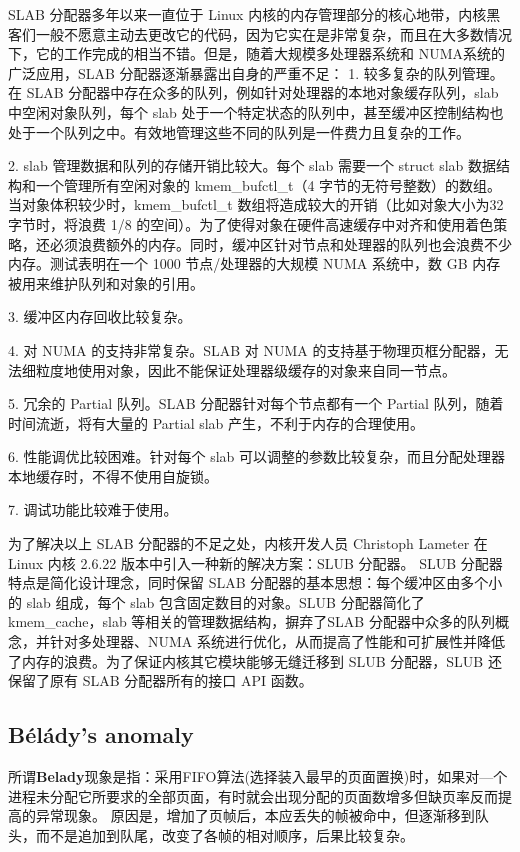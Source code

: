SLAB 分配器多年以来一直位于 Linux 内核的内存管理部分的核心地带，内核黑客们一般不愿意主动去更改它的代码，因为它实在是非常复杂，而且在大多数情况下，它的工作完成的相当不错。但是，随着大规模多处理器系统和 NUMA系统的广泛应用，SLAB 分配器逐渐暴露出自身的严重不足：
1. 较多复杂的队列管理。在 SLAB 分配器中存在众多的队列，例如针对处理器的本地对象缓存队列，slab 中空闲对象队列，每个 slab 处于一个特定状态的队列中，甚至缓冲区控制结构也处于一个队列之中。有效地管理这些不同的队列是一件费力且复杂的工作。

2. slab 管理数据和队列的存储开销比较大。每个 slab 需要一个 struct slab 数据结构和一个管理所有空闲对象的 kmem\_bufctl\_t（4 字节的无符号整数）的数组。当对象体积较少时，kmem\_bufctl\_t 数组将造成较大的开销（比如对象大小为32字节时，将浪费 1/8 的空间）。为了使得对象在硬件高速缓存中对齐和使用着色策略，还必须浪费额外的内存。同时，缓冲区针对节点和处理器的队列也会浪费不少内存。测试表明在一个 1000 节点/处理器的大规模 NUMA 系统中，数 GB 内存被用来维护队列和对象的引用。

3. 缓冲区内存回收比较复杂。

4. 对 NUMA 的支持非常复杂。SLAB 对 NUMA 的支持基于物理页框分配器，无法细粒度地使用对象，因此不能保证处理器级缓存的对象来自同一节点。

5. 冗余的 Partial 队列。SLAB 分配器针对每个节点都有一个 Partial 队列，随着时间流逝，将有大量的 Partial slab 产生，不利于内存的合理使用。

6. 性能调优比较困难。针对每个 slab 可以调整的参数比较复杂，而且分配处理器本地缓存时，不得不使用自旋锁。

7. 调试功能比较难于使用。

为了解决以上 SLAB 分配器的不足之处，内核开发人员 Christoph Lameter 在 Linux 内核 2.6.22 版本中引入一种新的解决方案：SLUB 分配器。
SLUB 分配器特点是简化设计理念，同时保留 SLAB 分配器的基本思想：每个缓冲区由多个小的 slab 组成，每个 slab 包含固定数目的对象。SLUB 分配器简化了kmem\_cache，slab 等相关的管理数据结构，摒弃了SLAB 分配器中众多的队列概念，并针对多处理器、NUMA 系统进行优化，从而提高了性能和可扩展性并降低了内存的浪费。为了保证内核其它模块能够无缝迁移到 SLUB 分配器，SLUB 还保留了原有 SLAB 分配器所有的接口 API 函数。


\subsection{Bélády's anomaly}
所谓\textbf{Belady}现象是指：采用FIFO算法(选择装入最早的页面置换)时，如果对—个进程未分配它所要求的全部页面，有时就会出现分配的页面数增多但缺页率反而提高的异常现象。
原因是，增加了页帧后，本应丢失的帧被命中，但逐渐移到队头，而不是追加到队尾，改变了各帧的相对顺序，后果比较复杂。












\clearpage

